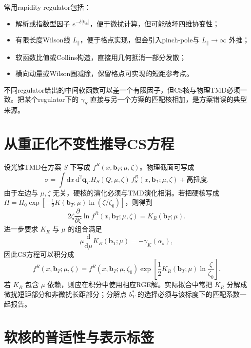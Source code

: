 \documentclass[UTF8,12pt,a4paper,twoside,openany]{ctexbook}
\newcommand{\dd}{\mathrm{d}}
\newcommand{\bT}{\boldsymbol b_T}
\begin{document}
常用rapidity regulator包括：
\begin{itemize}
  \item 解析或指数型因子 \(e^{-\delta|k_\pm|}\)，便于微扰计算，但可能破坏四维协变性；
  \item 有限长度Wilson线 \(L_\parallel\)，便于格点实现，但会引入pinch-pole与 \(L_\parallel\to\infty\) 外推；
  \item 软函数比值或Collins构造，直接用几何抵消一部分发散；
  \item 横向动量或Wilson圈减除，保留格点可实现的短距参考点。
\end{itemize}
不同regulator给出的中间软函数可以差一个有限因子，但CS核与物理TMD必须一致。把某个regulator下的 \(\gamma_S\) 直接与另一个方案的匹配核相加，是方案错误的典型来源。

\section{从重正化不变性推导CS方程}

设光锥TMD在方案 \(S\) 下写成 \(f^{R}(x,\bT;\mu,\zeta)\)。物理截面可写成
\begin{equation}
  \sigma=\int \dd x\,\dd^2\mathbf q_T\,
  H_S(Q,\mu,\zeta)\,f^{R}_S(x,\bT;\mu,\zeta)
  +\text{高扭度}.
  \label{eq:factorization-physical}
\end{equation}
由于左边与 \(\mu,\zeta\) 无关，硬核的演化必须与TMD演化相消。若把硬核写成 \(H=H_0\exp[-\frac12K(\bT;\mu)\ln(\zeta/\zeta_0)]\)，则得到
\begin{equation}
  2\zeta\frac{\partial}{\partial\zeta}
  \ln f^{R}(x,\bT;\mu,\zeta)
  =K_R(\bT;\mu).
  \label{eq:cs-equation}
\end{equation}
进一步要求 \(K_R\) 与 \(\mu\) 的组合满足
\begin{equation}
  \mu\frac{\dd}{\dd\mu}K_R(\bT;\mu)
  =-\gamma_K(\alpha_s),
  \label{eq:cs-rge}
\end{equation}
因此CS方程可以积分成
\begin{equation}
  f^{R}(x,\bT;\mu,\zeta)
  =f^{R}(x,\bT;\mu,\zeta_0)
  \exp\left[
  \frac12K_R(\bT;\mu)
  \ln\frac{\zeta}{\zeta_0}
  \right].
  \label{eq:factor-cs-solution}
\end{equation}
若 \(K_R\) 包含 \(\mu\) 依赖，则应在积分中使用相应RGE解。实际拟合中常把 \(K_R\) 分解成微扰短距部分和非微扰长距部分；分解点 \(b_T^*\) 的选择必须与该标度下的匹配系数一起报告。

\section{软核的普适性与表示标签}
\end{document}
